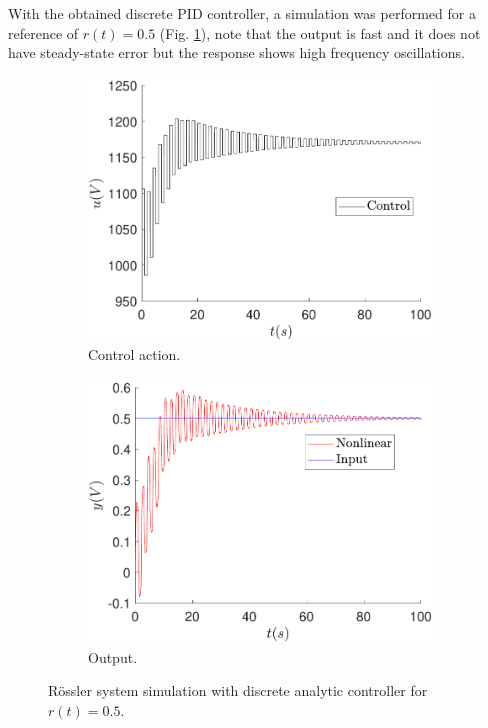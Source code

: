     With the obtained discrete PID controller, a simulation was performed for a reference of $r(t)=0.5$ (Fig. \ref{fig:anal_u_0_5}), note that the output is fast and it does not have steady-state error but the response shows high frequency oscillations.
    \begin{figure}
        \centering
        \begin{subfigure}[b]{0.475\textwidth}
            \centering
            \includegraphics[scale=0.425]{files/heuristic/analytic/control_analytic_u_0_5.pdf}
            \caption{Control action.}
        \end{subfigure}
        \vskip0.1cm
        \begin{subfigure}[b]{0.475\textwidth}   
            \centering 
            \includegraphics[scale=0.425]{files/heuristic/analytic/analytic_u_0_5.pdf}
            \caption{Output.}
        \end{subfigure}
        \caption{Rössler system simulation with discrete analytic controller for $r(t)=0.5$.}
        \label{fig:anal_u_0_5}
	\end{figure}
	
